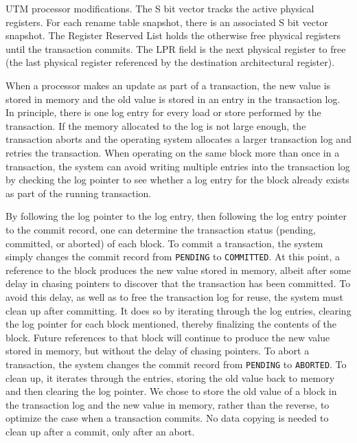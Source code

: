 %
{UTM processor modifications. The S bit vector
tracks the active physical registers.  For each rename table snapshot,
there is an associated S bit vector snapshot.  The Register Reserved
List holds the otherwise free physical registers until the transaction
commits.  The LPR field is the next physical register to free (the
last physical register referenced by the destination architectural
register).}


When a processor makes an update as part of a transaction, the new
value is stored in memory and the old value is stored in an entry in
the transaction log.  In principle, there is one log entry for every
load or store performed by the transaction.  If the memory allocated
to the log  is not large enough, the
transaction aborts and the operating system allocates a larger
transaction log and retries the transaction.  When
operating on the same block more than once in a transaction, the
system can avoid writing multiple entries into the transaction log by
checking the log pointer to see whether a log entry for the block
already exists as part of the running transaction.

By following the log pointer to the log entry, then following the log
entry pointer to the commit record, one can determine the transaction
status (pending, committed, or aborted) of each block.  To commit a
transaction, the system simply changes the commit record from
\texttt{PENDING} to \texttt{COMMITTED}.  At this point, a reference to
the block produces the new value stored in memory, albeit after some
delay in chasing pointers to discover that the transaction has been
committed.  To avoid this delay, as well as to free the transaction
log for reuse, the system must clean up after committing.  It does so
by iterating through the log entries, clearing the log pointer for
each block mentioned, thereby finalizing the contents of the block.
Future references to that block will continue to produce the new value
stored in memory, but without the delay of chasing pointers.  To abort
a transaction, the system changes the commit record from
\texttt{PENDING} to \texttt{ABORTED}.  To clean up, it iterates
through the entries, storing the old value back to memory and then
clearing the log pointer.  We chose to store the old value of a block
in the transaction log and the new value in memory, rather than the
reverse, to optimize the case when a transaction commits.  No data
copying is needed to clean up after a commit, only after an abort.

